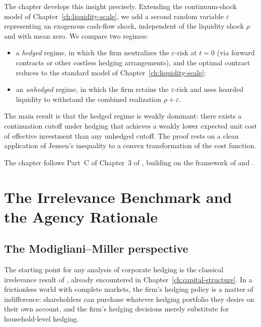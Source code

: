 \documentclass[11pt,a4paper,oneside]{book}
\theoremstyle{plain}
\theoremstyle{definition}
\theoremstyle{remark}
\numberwithin{equation}{chapter}
\begin{document}
The chapter develops this insight precisely.
Extending the continuum-shock model of Chapter~\ref{ch:liquidity-scale}, we add a second random variable $\varepsilon$ representing an exogenous cash-flow shock, independent of the liquidity shock $\rho$ and with mean zero.
We compare two regimes:
\begin{itemize}
  \item a \emph{hedged} regime, in which the firm neutralizes the $\varepsilon$-risk at $t=0$ (via forward contracts or other costless hedging arrangements), and the optimal contract reduces to the standard model of Chapter~\ref{ch:liquidity-scale};
  \item an \emph{unhedged} regime, in which the firm retains the $\varepsilon$-risk and uses hoarded liquidity to withstand the combined realization $\rho + \varepsilon$.
\end{itemize}
The main result is that the hedged regime is weakly dominant: there exists a continuation cutoff under hedging that achieves a weakly lower expected unit cost of effective investment than any unhedged cutoff.
The proof rests on a clean application of Jensen's inequality to a convex transformation of the cost function.

The chapter follows Part~C of Chapter~3 of \citet{Tirole2006}, building on the framework of \citet{FrootScharfsteinStein1993} and \citet{Stulz1984}.

\section{The Irrelevance Benchmark and the Agency Rationale}
\label{sec:RM-irrelevance}

\subsection{The Modigliani--Miller perspective}

The starting point for any analysis of corporate hedging is the classical irrelevance result of \citet{ModiglianiMiller1958}, already encountered in Chapter~\ref{ch:capital-structure}.
In a frictionless world with complete markets, the firm's hedging policy is a matter of indifference: shareholders can purchase whatever hedging portfolio they desire on their own account, and the firm's hedging decisions merely substitute for household-level hedging.
\end{document}
